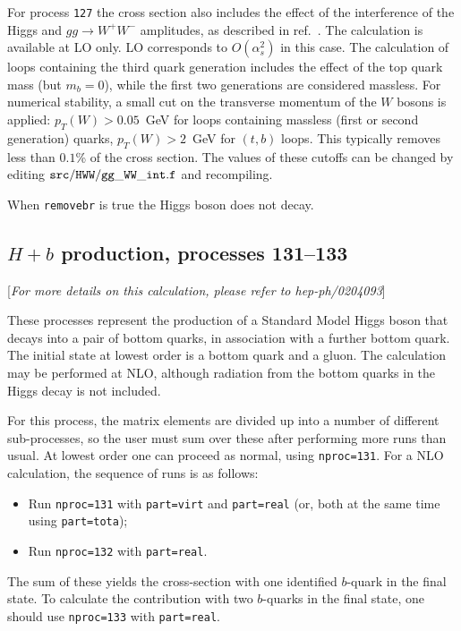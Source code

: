 \documentclass[12pt]{article}
\begin{document}
For process {\tt 127} the cross section also includes the effect of the interference of the
Higgs and $gg \to W^+W^-$ amplitudes, as described in ref.~\cite{Campbell:2011cu}.
The calculation is available at LO only. LO corresponds to $O(\alpha_s^2)$ in this case.
The calculation of loops containing the third quark generation
includes the effect of the top quark mass (but $m_b=0$), while the first two
generations are considered massless. For numerical stability, a small cut on the
transverse momentum of the $W$ bosons is applied: $p_T(W)>0.05$~GeV for loops
containing massless (first or second generation) quarks, $p_T(W)>2$~GeV for $(t,b)$
loops. This typically removes less than $0.1$\% of the cross section. The
values of these cutoffs can be changed by editing ${\tt src/HWW/gg\_WW\_int.f}$ and recompiling.


When {\tt removebr} is true the Higgs boson does not decay.

\subsection{$H+b$ production, processes 131--133}
\label{subsec:Hb}

\begin{center}
[{\it For more details on this calculation, please refer to hep-ph/0204093}]
\end{center}

These processes represent the production of a Standard Model Higgs
boson that decays into a pair of bottom quarks,
in association with a further bottom quark. The initial state at lowest order
is a bottom quark and a gluon.
The calculation may be performed at NLO, although radiation from the
bottom quarks in the Higgs decay is not included.

For this process, the matrix elements are divided up into a number of
different sub-processes, so the user must sum over these after performing
more runs than usual. At lowest order one can proceed as normal, using
{\tt nproc=131}. For a NLO calculation, the sequence of runs is as follows:
\begin{itemize}
\item Run {\tt nproc=131} with {\tt part=virt} and {\tt part=real} (or, both
at the same time using {\tt part=tota});
\item Run {\tt nproc=132} with {\tt part=real}.
\end{itemize}
The sum of these yields the cross-section with one identified $b$-quark in
the final state. To calculate the contribution with two $b$-quarks in the
final state, one should use {\tt nproc=133} with {\tt part=real}.
\end{document}
